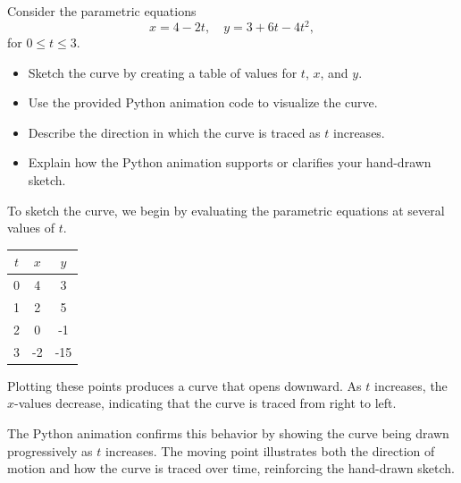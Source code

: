 \begin{Exercise}[label = parametric1]

    Consider the parametric equations
    \begin{equation*}
        x = 4 - 2t, \quad y = 3 + 6t - 4t^2,
    \end{equation*}
    for $0 \le t \le 3$.

    \begin{itemize}
        \item[(a)] Sketch the curve by creating a table of values for $t$, $x$, and $y$.
        \item[(b)] Use the provided Python animation code to visualize the curve.
        \item[(c)] Describe the direction in which the curve is traced as $t$ increases.
        \item[(d)] Explain how the Python animation supports or clarifies your hand-drawn sketch.
    \end{itemize}
    \vspace{80mm}
\end{Exercise}

\begin{Answer}[ref = parametric1]

    To sketch the curve, we begin by evaluating the parametric equations at several
    values of $t$.

    \begin{center}
        \begin{tabular}{c|c|c}
            $t$ & $x$ & $y$ \\
            \hline
            0   & 4   & 3   \\
            1   & 2   & 5   \\
            2   & 0   & -1  \\
            3   & -2  & -15
        \end{tabular}
    \end{center}

    Plotting these points produces a curve that opens downward. As $t$ increases,
    the $x$-values decrease, indicating that the curve is traced from right to left.

    The Python animation confirms this behavior by showing the curve being drawn
    progressively as $t$ increases. The moving point illustrates both the direction
    of motion and how the curve is traced over time, reinforcing the hand-drawn
    sketch.

\end{Answer}



